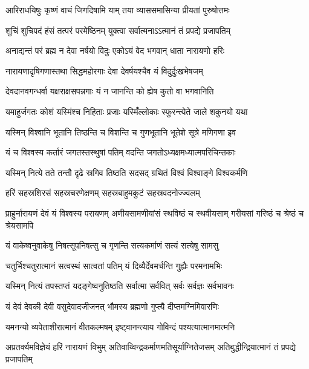 

\twolineshloka
{आरिराधयिषुः कृष्णं वाचं जिगदिषामि याम्}
{तया व्याससमासिन्या प्रीयतां पुरुषोत्तमः} %


\twolineshloka
{शुचिं शुचिपदं हंसं तत्परं परमेष्ठिनम्}
{युक्त्वा सर्वात्मनाऽऽत्मानं तं प्रपद्ये प्रजापतिम्} %


\twolineshloka
{अनाद्यन्तं परं ब्रह्म न देवा नर्षयो विदुः}
{एकोऽयं वेद भगवान् धाता नारायणो हरिः} %


\twolineshloka
{नारायणादृषिगणास्तथा सिद्धमहोरगाः}
{देवा देवर्षयश्चैव यं विदुर्दुःखभेषजम्} %


\twolineshloka
{देवदानवगन्धर्वा यक्षराक्षसपन्नगाः}
{यं न जानन्ति को ह्येष कुतो वा भगवानिति} %


\twolineshloka
{यमाहुर्जगतः कोशं यस्मिंश्च निहिताः प्रजाः}
{यस्मिँल्लोकाः स्फुरन्त्येते जाले शकुनयो यथा} %


\twolineshloka
{यस्मिन् विश्वानि भूतानि तिष्ठन्ति च विशन्ति च}
{गुणभूतानि भूतेशे सूत्रे मणिगणा इव} %


\twolineshloka
{यं च विश्वस्य कर्तारं जगतस्तस्थुषां पतिम्}
{वदन्ति जगतोऽध्यक्षमध्यात्मपरिचिन्तकाः} %


\twolineshloka
{यस्मिन् नित्ये तते तन्तौ दृढे स्रगिव तिष्ठति}
{सदसद् ग्रथितं विश्वं विश्वाङ्गे विश्वकर्मणि} %


\twolineshloka
{हरिं सहस्रशिरसं सहस्रचरणेक्षणम्}
{सहस्रबाहुमकुटं सहस्रवदनोज्ज्वलम्} %


\threelineshloka
{प्राहुर्नारायणं देवं यं विश्वस्य परायणम्}
{अणीयसामणीयांसं स्थविष्ठं च स्थवीयसाम्}
{गरीयसां गरिष्ठं च श्रेष्ठं च श्रेयसामपि} %


\twolineshloka
{यं वाकेष्वनुवाकेषु निषत्सूपनिषत्सु च}
{गृणन्ति सत्यकर्माणं सत्यं सत्येषु सामसु} %


\twolineshloka
{चतुर्भिश्चतुरात्मानं सत्वस्थं सात्वतां पतिम्}
{यं दिव्यैर्देवमर्चन्ति गुह्यैः परमनामभिः} %


\twolineshloka
{यस्मिन् नित्यं तपस्तप्तं यदङ्गेष्वनुतिष्ठति}
{सर्वात्मा सर्ववित् सर्वः सर्वज्ञः सर्वभावनः} %


\twolineshloka
{यं देवं देवकी देवी वसुदेवादजीजनत्}
{भौमस्य ब्रह्मणो गुप्त्यै दीप्तमग्निमिवारणिः} %


\twolineshloka
{यमनन्यो व्यपेताशीरात्मानं वीतकल्मषम्}
{इष्ट्वानन्त्याय गोविन्दं पश्यत्यात्मानमात्मनि} %


\threelineshloka
{अप्रतर्क्यमविज्ञेयं हरिं नारायणं विभुम्}
{अतिवाय्विन्द्रकर्माणमतिसूर्याग्नितेजसम्}
{अतिबुद्धीन्द्रियात्मानं तं प्रपद्ये प्रजापतिम्} %


